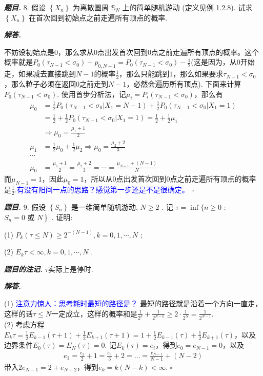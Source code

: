 \documentclass[10pt, a4paper, oneside]{ctexart}
\newenvironment{problem}{\begin{framed}\par\noindent\textbf{\textit{题目. }}}{\end{framed}\par}
\newenvironment{solution}{%
  \par\noindent\textbf{\textit{解答. }}\ignorespaces
}{%
  \hfill\ensuremath{\square}\par %
}
\newenvironment{note}{\par\noindent\textbf{\textit{题目的注记. }}\ignorespaces}{\par}
\begin{document}
\begin{problem}
    8. 假设 \( \left\{  {X}_{n}\right\}   \) 为离散圆周 \( {\mathbb{S}}_{N} \) 上的简单随机游动 (定义见例 1.2.8). 试求 \( \left\{  {X}_{n}\right\}   \) 在首次回到初始点之前走遍所有顶点的概率.
\end{problem}
\begin{solution}
    不妨设初始点是$0$，那么求从$0$点出发首次回到$0$点之前走遍所有顶点的概率。这个概率就是$P_{0}(\tau_{N-1}<\sigma_{0})-p_{0,N-1}=P_{0}(\tau_{N-1}<\sigma_{0})-\frac{1}{2}$(这是因为，从$0$开始走，如果减去直接跳到$N-1$的概率$\frac{1}{2}$，那么只能跳到$1$，那么如果要求$\tau_{N-1}<\sigma_0$，那么粒子必须在返回$0$之前走到$N-1$，必然会遍历所有顶点). 下面来计算$P_{0}(\tau_{N-1}<\sigma_{0})$. 使用首步分析法，记$\mu_i=P_i(\tau_{N-1}<\sigma_0)$，那么有
    \begin{align*}
        \mu_0&=\frac{1}{2}P_0(\tau_{N-1}<\sigma_0|X_1=N-1)+\frac{1}{2}P_0(\tau_{N-1}<\sigma_0|X_1=1)\\ &=\frac{1}{2}+\frac{1}{2}P_0(\tau_{N-1}<\sigma_0|X_1=1)=\frac{1}{2}+\frac{1}{2}\mu_1 \\&\Rightarrow \mu_0=\frac{\mu_1+1}{2}\\
        \mu_1&=\frac{1}{2}\mu_0+\frac{1}{2}\mu_2\Rightarrow \mu_0=\frac{\mu_2+2}{3}\\
        \cdots&\\ \mu_0&=\frac{\mu_1+1}{2}=\frac{\mu_2+2}{3}=\cdots=\frac{\mu_{N-1}+(N-1)}{N}
    \end{align*}
    而$\mu_{N-1}=1$，因此$\mu_0=1$，所以从$0$点出发首次回到$0$点之前走遍所有顶点的概率是$\frac{1}{2}$.\textcolor{blue}{有没有阳间一点的思路？感觉第一步还是不是很确定。}
\end{solution}

\begin{problem}
    9. 假设 \( \left\{  {S}_{n}\right\}   \) 是一维简单随机游动, \( N \geq  2 \) . 记 \( \tau  = \inf \{ n \geq  0 \) : \( \left. {{S}_{n} = 0\text{ 或 }N}\right\}   \) . 证明:

(1) \( {P}_{k}\left( {\tau  \leq  N}\right)  \geq  {2}^{-\left( {N - 1}\right) },k = 0,1,\cdots ,N \) ;

(2) \( {E}_{k}\tau  < \infty ,k = 0,1,\cdots ,N \) .
\end{problem}
\begin{note}
    $\tau$实际上是停时.
\end{note}

\begin{solution}
    (1) \textcolor{blue}{注意力惊人：思考耗时最短的路径是？} 最短的路径就是沿着一个方向一直走，这样的话$\tau\leq N$一定成立，这样的概率和是$\frac{1}{2^k}+\frac{1}{2^{N-k}}\geq 2\cdot\frac{1}{2^N}=\frac{1}{2^{N-1}}$.\\ 
    (2) 考虑方程$E_k\tau=\frac{1}{2}E_{k-1}(\tau+1)+\frac{1}{2}E_{k+1}(\tau+1)=1+\frac{1}{2}E_{k-1}(\tau)+\frac{1}{2}E_{k+1}(\tau)$，以及边界条件$E_0(\tau)=E_{N}(\tau)=0$. 记$E_k(\tau)=e_i$，得到$e_0=e_{N-1}=0$，以及
    \begin{align*}
        e_1=\frac{e_2}{2}+1=\frac{e_3}{3}+2=\dots=\frac{e_{N-1}}{N-1}+(N-2)
    \end{align*}
    带入$2e_{N-1}=2+e_{N-2}$，得到$e_k=k(N-k)<\infty$.
\end{solution}
\end{document}
